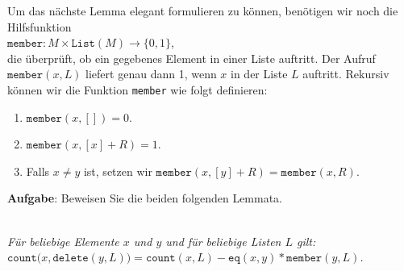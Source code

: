 Um das n\"achste Lemma elegant formulieren zu k\"onnen, ben\"otigen wir noch die Hilfsfunktion \\[0.1cm]
\hspace*{1.3cm} $\texttt{member}: M \times \mathtt{List}(M) \rightarrow \{0,1\}$, \\[0.1cm]
die \"uberpr\"uft, ob ein gegebenes Element in einer Liste auftritt.  Der Aufruf $\mathtt{member}(x,L)$
liefert genau dann 1, wenn $x$ in der Liste $L$ auftritt.  Rekursiv k\"onnen wir die Funktion 
\texttt{member} wie folgt definieren: 
\begin{enumerate}
\item $\mathtt{member}(x,[]) = 0$.
\item $\mathtt{member}(x,[x] + R) = 1$.
\item Falls $x \not= y$ ist, setzen wir $\mathtt{member}(x,[y] + R) = \mathtt{member}(x,R)$.
\end{enumerate}

\noindent
\textbf{Aufgabe}: Beweisen Sie die beiden folgenden Lemmata.
\begin{Lemma} \hspace*{\fill} \\[0.1cm]
{\em
  F\"ur beliebige Elemente $x$ und $y$ und f\"ur beliebige  Listen $L$ gilt: \\[0.1cm]
  \hspace*{1.3cm} 
  $\mathtt{count}\bigl(x, \mathtt{delete}(y,L)\bigr) = \mathtt{count}(x,L) - \mathtt{eq}(x,y)*\mathtt{member}(y,L)$.
}
\end{Lemma}


